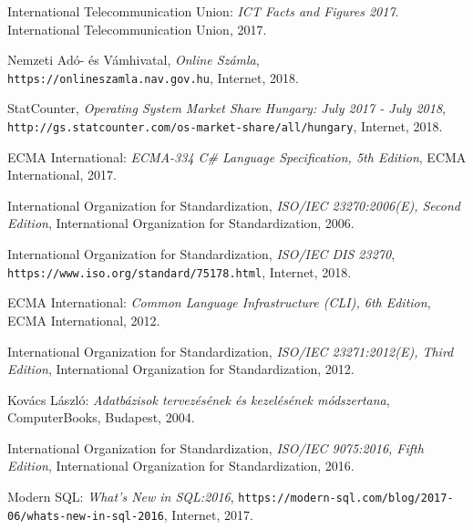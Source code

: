 
\begin{thebibliography}{x}

International Telecommunication Union: \emph{ICT Facts and Figures 2017}. International Telecommunication Union, 2017.

Nemzeti Adó- és Vámhivatal, \emph{Online Számla}, \texttt{https://onlineszamla.nav.gov.hu}, Internet, 2018.

StatCounter, \emph{Operating System Market Share Hungary: July 2017 - July 2018},  \texttt{http://gs.statcounter.com/os-market-share/all/hungary}, Internet, 2018.

ECMA International: \emph{ECMA-334 C\# Language Specification, 5th Edition}, ECMA International, 2017.

International Organization for Standardization, \emph{ISO/IEC 23270:2006(E), Second Edition}, International Organization for Standardization, 2006.

International Organization for Standardization, \emph{ISO/IEC DIS 23270}, \texttt{https://www.iso.org/standard/75178.html}, Internet, 2018.

ECMA International: \emph{Common Language Infrastructure (CLI), 6th Edition}, ECMA International, 2012.

International Organization for Standardization, \emph{ISO/IEC 23271:2012(E), Third Edition}, International Organization for Standardization, 2012.

Kovács László: \emph{Adatbázisok tervezésének és kezelésének módszertana}, ComputerBooks, Budapest, 2004.

International Organization for Standardization, \emph{ISO/IEC 9075:2016, Fifth Edition}, International Organization for Standardization, 2016.

Modern SQL: \emph{What's New in SQL:2016}, \texttt{https://modern-sql.com/blog/2017-06/whats-new-in-sql-2016}, Internet, 2017.










\begin{comment}


\end{comment}
\end{thebibliography}
